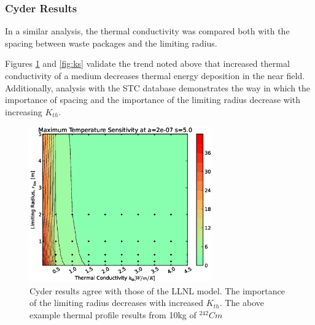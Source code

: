 \FloatBarrier
\subsubsection{Cyder Results}

In a similar analysis, the thermal conductivity was compared both with the 
spacing between waste packages and the limiting radius. 

Figures \ref{fig:kr} and \ref{fig:ks} validate the trend noted above that 
increased thermal conductivity of a medium decreases thermal energy deposition 
in the near field.  Additionally, analysis with the \Cyder STC database 
demonstrates the way in which the importance of spacing and the importance of 
the limiting radius decrease with increasing $K_{th}$.

\begin{figure}[htbp!]
\begin{center}
\includegraphics[width=0.7\textwidth]{./chapters/demonstration/conductivity/kr.eps}
\end{center}
\caption[$K_{th}$ vs. $r_{lim}$ Sensitivity in Cyder]
{Cyder results agree with 
those of the LLNL model. The importance of the limiting radius decreases with 
increased $K_{th}$. The above example thermal profile results from 10kg of 
$^{242}Cm$}
\label{fig:kr}
\end{figure}

